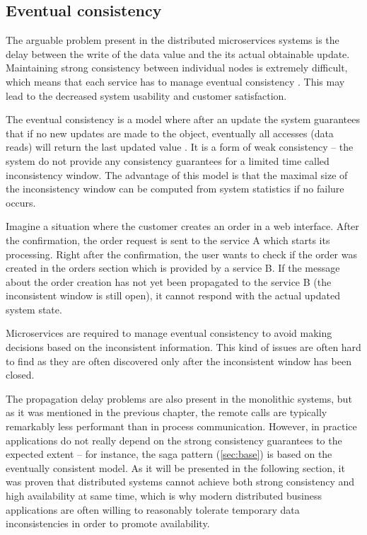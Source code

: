 \documentclass[oneside,
  digital, %
  table,   %
  lof,     %
  lot,     %
]{fithesis3}
\begin{document}
\subsection{Eventual consistency}
\label{sec:eventual-consistency}

The arguable problem present in the distributed microservices systems is the delay between the write of the data value and the its actual obtainable update. Maintaining strong consistency between individual nodes is extremely difficult, which means that each service has to manage eventual consistency \cite{ms_tradeoffs}. This may lead to the decreased system usability and customer satisfaction.

The eventual consistency is a model where after an update the system guarantees that if no new updates are made to the object, eventually all accesses (data reads) will return the last updated value \cite{event_consist}. It is a form of weak consistency -- the system do not provide any consistency guarantees for a limited time called inconsistency window. The advantage of this model is that the maximal size of the inconsistency window can be computed from system statistics if no failure occurs.

Imagine a situation where the customer creates an order in a web interface. After the confirmation, the order request is sent to the service A which starts its processing. Right after the confirmation, the user wants to check if the order was created in the orders section which is provided by a service B. If the message about the order creation has not yet been propagated to the service B (the inconsistent window is still open), it cannot respond with the actual updated system state. 

Microservices are required to manage eventual consistency to avoid making decisions based on the inconsistent information. This kind of issues are often hard to find as they are often discovered only after the inconsistent window has been closed.

The propagation delay problems are also present in the monolithic systems, but as it was mentioned in the previous chapter, the remote calls are typically remarkably less performant than in process communication. However, in practice applications do not really depend on the strong consistency guarantees to the expected extent -- for instance, the saga pattern (\ref{sec:base}) is based on the eventually consistent model. As it will be presented in the following section, it was proven that distributed systems cannot achieve both strong consistency and high availability at same time, which is why modern distributed business applications are often willing to reasonably tolerate temporary data inconsistencies in order to promote availability.
\end{document}
